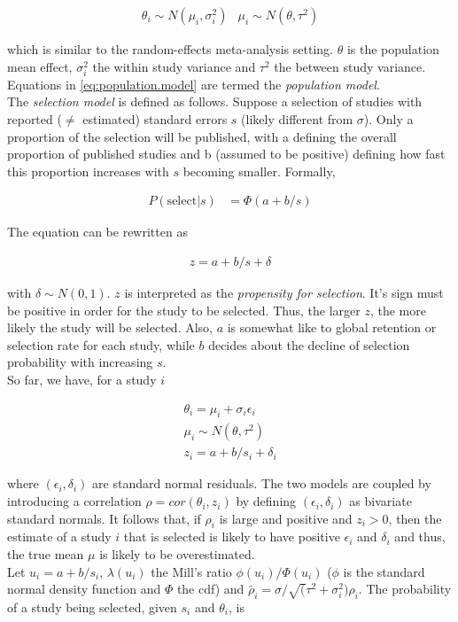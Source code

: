 \begin{align}
\theta_i \sim N(\mu_i, \sigma_i^2) &
\mu_i \sim N(\theta, \tau^2) \label{eq:population.model}
\end{align}

which is similar to the random-effects meta-analysis setting. $\theta$ is the population mean effect, $\sigma_i^2$ the within study variance and $\tau^2$ the between study variance. Equations in \ref{eq:population.model} are termed the \textit{population model}. \\
The \textit{selection model} is defined as follows. Suppose a selection of studies with reported ($\neq$ estimated) standard errors $s$ (likely different from $\sigma$). Only a proportion of the selection will be published, with a defining the overall proportion of published studies and b (assumed to be positive) defining how fast this proportion increases with $s$ becoming smaller. Formally,

\begin{align}
P(\textrm{select}|s) &= \Phi(a + b/s) \nonumber %
\end{align}

The equation can be rewritten as 

\begin{align}
z = a + b/s + \delta \nonumber %
\end{align}

with $\delta \sim N(0,1)$. $z$ is interpreted as the \textit{propensity for selection}. It's sign must be positive in order for the study to be selected. Thus, the larger $z$, the more likely the study will be selected. Also, $a$ is somewhat like to global retention or selection rate for each study, while $b$ decides about the decline of selection probability with increasing $s$.\\
So far, we have, for a study $i$

\begin{align}
\theta_i = \mu_i + \sigma_i\epsilon_i \nonumber \\ 
\mu_i \sim N(\theta, \tau^2) \nonumber \\
z_i = a + b/s_i + \delta_i \nonumber
\end{align}

where $(\epsilon_i, \delta_i)$ are standard normal residuals. The two models are coupled by introducing a correlation $\rho = cor(\theta_i, z_i)$ by defining $(\epsilon_i, \delta_i)$ as bivariate standard normals. It follows that,
if $\rho_i$ is large and positive and $z_i > 0$, then the estimate of a study $i$ that is selected is likely to have positive $\epsilon_i$ and $\delta_i$ and thus, the true mean $\mu$ is likely to be overestimated. \\
Let $u_i = a + b/s_i$, $\lambda(u_i)$ the Mill's ratio $\phi(u_i)/\Phi(u_i)$ ($\phi$ is the standard normal density function and $\Phi$ the cdf) and $\tilde{\rho_i} = \sigma/\sqrt(\tau^2 + \sigma_i^2) \rho_i$. The probability of a study being selected, given $s_i$ and $\theta_i$, is

